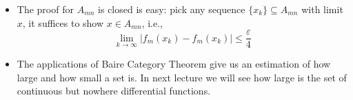 \begin{remark}
\begin{itemize}
\item
The proof for $A_{mn}$ is closed is easy: pick any sequence $\{x_k\}\subseteq A_{mn}$ with limit $x$, it suffices to show $x\in A_{mn}$, i.e., 
\[
\lim_{k\to\infty}|f_m(x_k) - f_m(x_k)|\le\frac{\varepsilon}{4}
\]
\item
The applications of Baire Category Theorem give us an estimation of how large and how small a set is. In next lecture we will see how large is the set of continuous but nowhere differential functions.
\end{itemize}
\end{remark}














